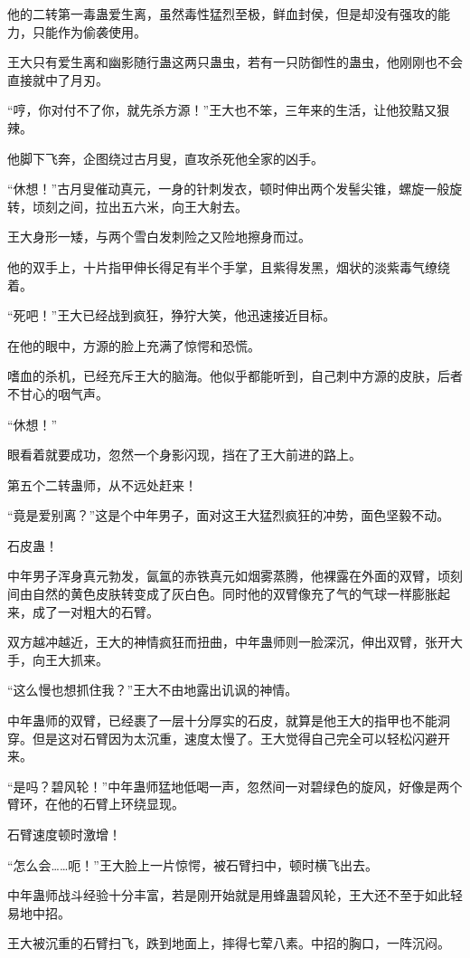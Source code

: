 \begin{this_body}
他的二转第一毒蛊爱生离，虽然毒性猛烈至极，鲜血封侯，但是却没有强攻的能力，只能作为偷袭使用。

王大只有爱生离和幽影随行蛊这两只蛊虫，若有一只防御性的蛊虫，他刚刚也不会直接就中了月刃。

“哼，你对付不了你，就先杀方源！”王大也不笨，三年来的生活，让他狡黠又狠辣。

他脚下飞奔，企图绕过古月叟，直攻杀死他全家的凶手。

“休想！”古月叟催动真元，一身的针刺发衣，顿时伸出两个发髻尖锥，螺旋一般旋转，顷刻之间，拉出五六米，向王大射去。

王大身形一矮，与两个雪白发刺险之又险地擦身而过。

他的双手上，十片指甲伸长得足有半个手掌，且紫得发黑，烟状的淡紫毒气缭绕着。

“死吧！”王大已经战到疯狂，狰狞大笑，他迅速接近目标。

在他的眼中，方源的脸上充满了惊愕和恐慌。

嗜血的杀机，已经充斥王大的脑海。他似乎都能听到，自己刺中方源的皮肤，后者不甘心的咽气声。

“休想！”

眼看着就要成功，忽然一个身影闪现，挡在了王大前进的路上。

第五个二转蛊师，从不远处赶来！

“竟是爱别离？”这是个中年男子，面对这王大猛烈疯狂的冲势，面色坚毅不动。

石皮蛊！

中年男子浑身真元勃发，氤氲的赤铁真元如烟雾蒸腾，他裸露在外面的双臂，顷刻间由自然的黄色皮肤转变成了灰白色。同时他的双臂像充了气的气球一样膨胀起来，成了一对粗大的石臂。

双方越冲越近，王大的神情疯狂而扭曲，中年蛊师则一脸深沉，伸出双臂，张开大手，向王大抓来。

“这么慢也想抓住我？”王大不由地露出讥讽的神情。

中年蛊师的双臂，已经裹了一层十分厚实的石皮，就算是他王大的指甲也不能洞穿。但是这对石臂因为太沉重，速度太慢了。王大觉得自己完全可以轻松闪避开来。

“是吗？碧风轮！”中年蛊师猛地低喝一声，忽然间一对碧绿色的旋风，好像是两个臂环，在他的石臂上环绕显现。

石臂速度顿时激增！

“怎么会……呃！”王大脸上一片惊愕，被石臂扫中，顿时横飞出去。

中年蛊师战斗经验十分丰富，若是刚开始就是用蜂蛊碧风轮，王大还不至于如此轻易地中招。

王大被沉重的石臂扫飞，跌到地面上，摔得七荤八素。中招的胸口，一阵沉闷。


\end{this_body}
